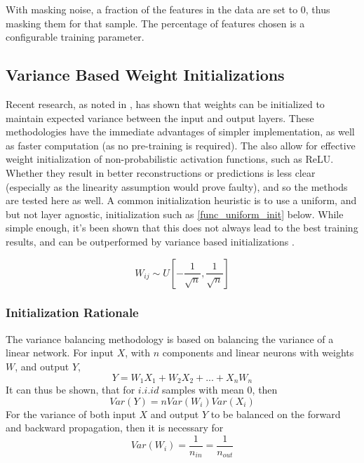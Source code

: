 \documentclass[a4paper,latin]{paper}
\begin{document}
With masking noise, a fraction of the features in the data are set to 0, thus masking them for that sample. The percentage of features chosen is a configurable training parameter.

\subsection{Variance Based Weight Initializations}\label{imp_weights}

Recent research, as noted in \cite{He}, has shown that weights can be initialized to maintain expected variance between the input and output layers. These methodologies have the immediate advantages of simpler implementation, as well as faster computation (as no pre-training is required). The also allow for effective weight initialization of non-probabilistic activation functions, such as ReLU. Whether they result in better reconstructions or predictions is less clear (especially as the linearity assumption would prove faulty), and so the methods are tested here as well. 
\newline\newline
A common initialization heuristic is to use a uniform, and but not layer agnostic, initialization such as \ref{func_uniform_init} below. While simple enough, it's been shown that this does not always lead to the best training results, and can be outperformed by variance based initializations \cite{Glorot}.

\begin{equation}\label{func_uniform_init}
W_{i j} \sim U\left[-\frac{1}{\sqrt{n}}, \frac{1}{\sqrt{n}}\right]
\end{equation}

\subsubsection{Initialization Rationale}

The variance balancing methodology is based on balancing the variance of a linear network. For input $X$, with $n$ components and linear neurons with weights $W$, and output $Y$,
\begin{equation}
Y = W_1X_1 + W_2X_2 + ... + X_nW_n
\end{equation}
It can thus be shown, that for $i.i.id$ samples with mean $0$, then
\begin{equation}
Var(Y) = nVar(W_i)Var(X_i)
\end{equation}
For the variance of both input $X$ and output $Y$ to be balanced on the forward and backward propagation, then it is necessary for
\begin{equation}
Var(W_i) = \frac{1}{n_{in}}= \frac{1}{n_{out}}
\end{equation}
\end{document}
